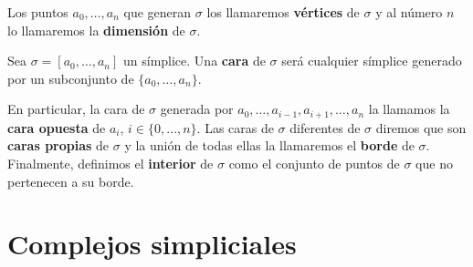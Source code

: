 Los puntos $a_0, \dots, a_n$ que generan $\sigma$ los llamaremos \textbf{vértices} de $\sigma$
y al número $n$ lo llamaremos la \textbf{dimensión} de $\sigma$.

\begin{definicion}
	Sea $\sigma=[a_0, \dots, a_n]$ un símplice. Una \textbf{cara} de $\sigma$ será cualquier
	símplice generado por un subconjunto de $\{a_0, \dots, a_n\}$.
\end{definicion}
En particular, la cara de $\sigma$ generada por $a_0, \dots, a_{i-1}, a_{i+1}, \dots, a_n$ la 
llamamos la \textbf{cara opuesta} de $a_i$, $i \in \{0, \dots, n\}$. Las caras de $\sigma$ 
diferentes de $\sigma$ diremos que son \textbf{caras propias} de $\sigma$ y la unión de todas ellas la 
llamaremos el \textbf{borde} de $\sigma$. Finalmente, definimos el \textbf{interior} de $\sigma$
como el conjunto de puntos de $\sigma$ que no pertenecen a su borde.

\section{Complejos simpliciales}

\endinput
